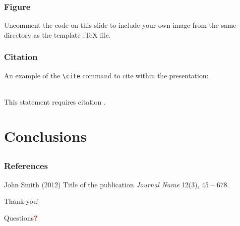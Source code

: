 \documentclass{beamer}
\begin{document}

\begin{frame}
\frametitle{Figure}
Uncomment the code on this slide to include your own image from the same directory as the template .TeX file.
\end{frame}


\begin{frame}[fragile] %
\frametitle{Citation}
An example of the \verb|\cite| command to cite within the presentation:\\~

This statement requires citation \cite{p1}.
\end{frame}

\section{Conclusions}
\subsection{}

\begin{frame}
\frametitle{References}
\footnotesize{
\begin{thebibliography}{99} %
 John Smith (2012)
\newblock Title of the publication
\newblock \emph{Journal Name} 12(3), 45 -- 678.
\end{thebibliography}
}
\end{frame}


\begin{frame}
\Large
\centerline{Thank you!}
\medskip
\centerline{Questions\textcolor{red}{\textbf{?}}}
\end{frame}

\end{document}
